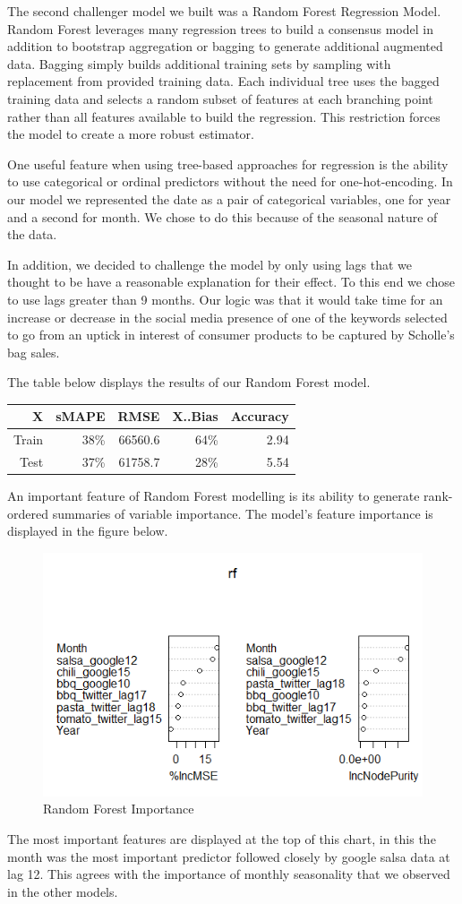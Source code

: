 \documentclass[12pt,oneside]{chicagocapstone}
\begin{document}
The second challenger model we built was a Random Forest Regression
Model. Random Forest leverages many regression trees to build a
consensus model in addition to bootstrap aggregation or bagging to
generate additional augmented data. Bagging simply builds additional
training sets by sampling with replacement from provided training data.
Each individual tree uses the bagged training data and selects a random
subset of features at each branching point rather than all features
available to build the regression. This restriction forces the model to
create a more robust estimator.

One useful feature when using tree-based approaches for regression is
the ability to use categorical or ordinal predictors without the need
for one-hot-encoding. In our model we represented the date as a pair of
categorical variables, one for year and a second for month. We chose to
do this because of the seasonal nature of the data.

In addition, we decided to challenge the model by only using lags that
we thought to be have a reasonable explanation for their effect. To this
end we chose to use lags greater than 9 months. Our logic was that it
would take time for an increase or decrease in the social media presence
of one of the keywords selected to go from an uptick in interest of
consumer products to be captured by Scholle's bag sales.

The table below displays the results of our Random Forest model.
\begin{longtable}[]{@{}rrrrr@{}}
\toprule
X & sMAPE & RMSE & X..Bias & Accuracy\tabularnewline
\midrule
\endhead
Train & 38\% & 66560.6 & 64\% & 2.94\tabularnewline
Test & 37\% & 61758.7 & 28\% & 5.54\tabularnewline
\bottomrule
\end{longtable}
An important feature of Random Forest modelling is its ability to
generate rank-ordered summaries of variable importance. The model's
feature importance is displayed in the figure below.
\begin{figure}
\centering
\includegraphics{./figure/RF_V_Imp.png}
\caption{Random Forest Importance}
\end{figure}
The most important features are displayed at the top of this chart, in
this the month was the most important predictor followed closely by
google salsa data at lag 12. This agrees with the importance of monthly
seasonality that we observed in the other models.
\end{document}
